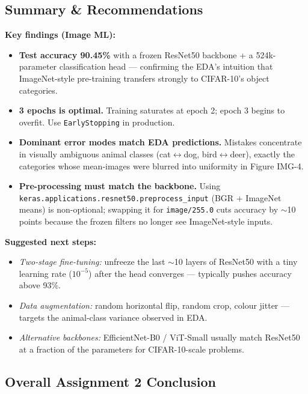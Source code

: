 \subsection{Summary \& Recommendations}

\begin{importantbox}
\textbf{Key findings (Image ML):}
\begin{itemize}
    \item \textbf{Test accuracy 90.45\%} with a frozen ResNet50 backbone + a 524k-parameter classification head --- confirming the EDA's intuition that ImageNet-style pre-training transfers strongly to CIFAR-10's object categories.
    \item \textbf{3 epochs is optimal.} Training saturates at epoch 2; epoch 3 begins to overfit. Use \texttt{EarlyStopping} in production.
    \item \textbf{Dominant error modes match EDA predictions.} Mistakes concentrate in visually ambiguous animal classes (cat$\leftrightarrow$dog, bird$\leftrightarrow$deer), exactly the categories whose mean-images were blurred into uniformity in Figure IMG-4.
    \item \textbf{Pre-processing must match the backbone.} Using \texttt{keras.applications.resnet50.preprocess\_input} (BGR + ImageNet means) is non-optional; swapping it for \texttt{image/255.0} cuts accuracy by $\sim$10 points because the frozen filters no longer see ImageNet-style inputs.
\end{itemize}

\textbf{Suggested next steps:}
\begin{itemize}
    \item \emph{Two-stage fine-tuning:} unfreeze the last $\sim$10 layers of ResNet50 with a tiny learning rate ($10^{-5}$) after the head converges --- typically pushes accuracy above 93\%.
    \item \emph{Data augmentation:} random horizontal flip, random crop, colour jitter --- targets the animal-class variance observed in EDA.
    \item \emph{Alternative backbones:} EfficientNet-B0 / ViT-Small usually match ResNet50 at a fraction of the parameters for CIFAR-10-scale problems.
\end{itemize}
\end{importantbox}

\subsection{Overall Assignment 2 Conclusion}

